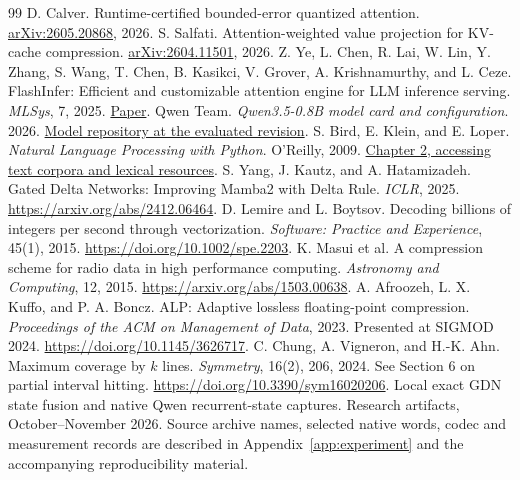 \begin{thebibliography}{99}
 D. Calver. Runtime-certified bounded-error quantized attention. \href{https://arxiv.org/abs/2605.20868}{arXiv:2605.20868}, 2026.
 S. Salfati. Attention-weighted value projection for KV-cache compression. \href{https://arxiv.org/abs/2604.11501}{arXiv:2604.11501}, 2026.
 Z. Ye, L. Chen, R. Lai, W. Lin, Y. Zhang, S. Wang, T. Chen, B. Kasikci, V. Grover, A. Krishnamurthy, and L. Ceze. FlashInfer: Efficient and customizable attention engine for LLM inference serving. \emph{MLSys}, 7, 2025. \href{https://arxiv.org/abs/2501.01005}{Paper}.
 Qwen Team. \emph{Qwen3.5-0.8B model card and configuration}. 2026. \href{https://huggingface.co/Qwen/Qwen3.5-0.8B/tree/2fc06364715b967f1860aea9cf38778875588b17}{Model repository at the evaluated revision}.
 S. Bird, E. Klein, and E. Loper. \emph{Natural Language Processing with Python}. O'Reilly, 2009. \href{https://www.nltk.org/book/ch02.html}{Chapter 2, accessing text corpora and lexical resources}.
 S. Yang, J. Kautz, and A. Hatamizadeh. Gated Delta Networks: Improving Mamba2 with Delta Rule. \emph{ICLR}, 2025. \url{https://arxiv.org/abs/2412.06464}.
 D. Lemire and L. Boytsov. Decoding billions of integers per second through vectorization. \emph{Software: Practice and Experience}, 45(1), 2015. \url{https://doi.org/10.1002/spe.2203}.
 K. Masui et al. A compression scheme for radio data in high performance computing. \emph{Astronomy and Computing}, 12, 2015. \url{https://arxiv.org/abs/1503.00638}.
 A. Afroozeh, L. X. Kuffo, and P. A. Boncz. ALP: Adaptive lossless floating-point compression. \emph{Proceedings of the ACM on Management of Data}, 2023. Presented at SIGMOD 2024. \url{https://doi.org/10.1145/3626717}.
 C. Chung, A. Vigneron, and H.-K. Ahn. Maximum coverage by $k$ lines. \emph{Symmetry}, 16(2), 206, 2024. See Section 6 on partial interval hitting. \url{https://doi.org/10.3390/sym16020206}.
 Local exact GDN state fusion and native Qwen recurrent-state captures. Research artifacts, October--November 2026. Source archive names, selected native words, codec and measurement records are described in Appendix~\ref{app:experiment} and the accompanying reproducibility material.
\end{thebibliography}
